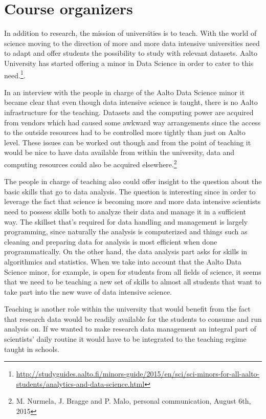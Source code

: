 \fi

\section{Course organizers}

In addition to research, the mission of universities is to teach. With the
world of science moving to the direction of more and more data intensive
universities need to adapt and offer students the possibility to study with
relevant datasets. Aalto University has started offering a minor in Data
Science in order to cater to this need.\footnote{\url{http://studyguides.aalto.fi/minors-guide/2015/en/sci/sci-minors-for-all-aalto-students/analytics-and-data-science.html}}.

In an interview with the people in charge of the Aalto Data Science minor
it became clear that even though data intensive science is taught, there is no
Aalto infrastructure for the teaching. Datasets and the computing power are
acquired from vendors which had caused some awkward way arrangements since the
access to the outside resources had to be controlled more tightly than just
on Aalto level. These issues can be worked out though and from the point of
teaching it would be nice to have data available from within the university,
data and computing resources could also be acquired elsewhere.\footnote{M. Nurmela,
J. Bragge and P. Malo, personal communication, August 6th, 2015}

The people in charge of teaching also could offer insight to the question about
the basic skills that go to data analysis. The question is interesting since
in order to leverage the fact that science is becoming more and more data
intensive scientists need to possess skills both to analyze their data and
manage it in a sufficient way. The skillset that's required for data handling
and management is largely programming, since naturally the analysis is
computerized and things such as cleaning and preparing data for analysis is
most efficient when done programmatically. On the other hand, the data analysis
part asks for skills in algorithmics and statistics. When we take into account
that the Aalto Data Science minor, for example, is open for students from all
fields of science, it seems that we need to be teaching a new set of skills to
almost all students that want to take part into the new wave of data intensive
science.

\iffalse

Teaching is another role within the university that would benefit from the fact
that research data would be readily available for the students to consume and
run analysis on. If we wanted to make research data management an integral part
of scientists' daily routine it would have to be integrated to the teaching
regime taught in schools.

